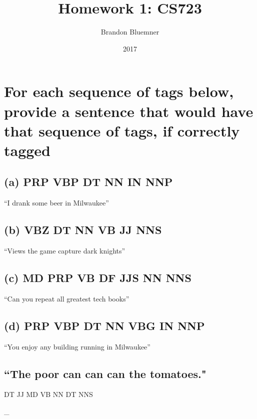 \documentclass[12pt]{article}
\begin{document}
\title{Homework 1: CS723}
\author{Brandon Bluemner}
\date{2017}
\maketitle
\section{For each sequence of tags below, provide a sentence
 that would have that sequence of tags, if correctly
tagged}
\subsection{(a) PRP VBP DT NN IN NNP}
``I drank some beer in Milwaukee''
\subsection{(b) VBZ DT NN VB JJ NNS}
``Views the game capture dark knights''
\subsection{(c) MD PRP VB DF JJS NN NNS}
``Can you repeat all greatest tech books''
\subsection{(d) PRP VBP DT NN VBG IN NNP}
``You enjoy any building running in Milwaukee''
\subsection{``The poor can can can the tomatoes."}
DT JJ MD VB NN DT NNS


_
\cite{*}


\end{document}
